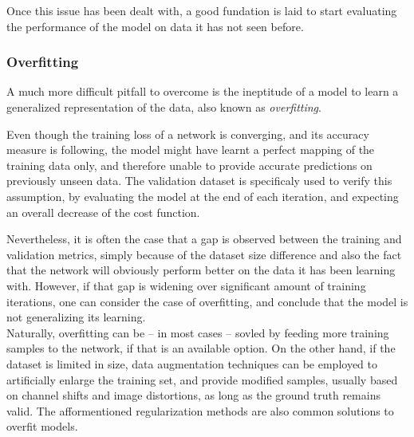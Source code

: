 Once this issue has been dealt with, a good fundation is laid to start
evaluating the performance of the model on data it has not seen before.

	\subsubsection{Overfitting}

A much more difficult pitfall to overcome is the ineptitude of a model to learn
a generalized representation of the data, also known as \emph{overfitting}.

Even though the training loss of a network is converging, and its accuracy
measure is following, the model might have learnt a perfect mapping of the
training data only, and therefore unable to provide accurate predictions on
previously unseen data. The validation dataset is specificaly used to verify
this assumption, by evaluating the model at the end of each iteration, and
expecting an overall decrease of the cost function.

Nevertheless, it is often the case that a gap is observed between the training
and validation metrics, simply because of the dataset size difference and also
the fact that the network will obviously perform better on the data it has been
learning with. However, if that gap is widening over significant amount of
training iterations, one can consider the case of overfitting, and conclude
that the model is not generalizing its learning.\\

Naturally, overfitting can be -- in most cases -- sovled by feeding more
training samples to the network, if that is an available option. On the other
hand, if the dataset is limited in size, data augmentation techniques can be
employed to artificially enlarge the training set, and provide modified
samples, usually based on channel shifts and image distortions, as long as the
ground truth remains valid. The afformentioned regularization methods are also
common solutions to overfit models.
